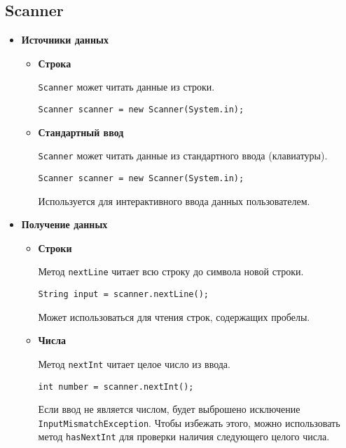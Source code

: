 \subsection{Scanner}
\begin{itemize}
    \item \textbf{Источники данных}
    \begin{itemize}
        \item \textbf{Строка}\par
        \texttt{Scanner} может читать данные из строки.
        \begin{verbatim}
Scanner scanner = new Scanner(System.in);
        \end{verbatim}

        \item \textbf{Стандартный ввод}\par
        \texttt{Scanner} может читать данные из стандартного ввода (клавиатуры).
        \begin{verbatim}
Scanner scanner = new Scanner(System.in);
        \end{verbatim}
        Используется для интерактивного ввода данных пользователем.
        
    \end{itemize}
    \item \textbf{Получение данных}
    \begin{itemize}
        \item \textbf{Строки}\par
        Метод \texttt{nextLine} читает всю строку до символа новой строки.
        \begin{verbatim}
String input = scanner.nextLine();
        \end{verbatim}
        Может использоваться для чтения строк, содержащих пробелы.
        \item \textbf{Числа}\par
        Метод \texttt{nextInt} читает целое число из ввода.
        \begin{verbatim}
int number = scanner.nextInt();
        \end{verbatim}
        Если ввод не является числом, будет выброшено исключение \\ \texttt{InputMismatchException}.\newline 
        Чтобы избежать этого, можно использовать метод \texttt{hasNextInt} для проверки наличия следующего целого числа.
    \end{itemize}
\end{itemize}